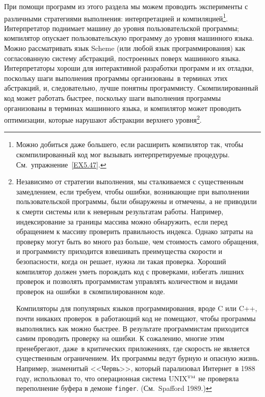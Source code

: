  
При помощи программ из этого раздела мы можем проводить
эксперименты с различными стратегиями выполнения: интерпретацией и
компиляцией\footnote{Можно добиться даже большего, если расширить
компилятор так, чтобы скомпилированный код мог вызывать
интерпретируемые процедуры.  См.~упражнение~\ref{EX5.47}.
}.
Интерпретатор поднимает машину до уровня пользовательской программы;
компилятор опускает пользовательскую программу до уровня машинного
языка.  Можно рассматривать язык Scheme (или любой язык
программирования) как согласованную систему абстракций, построенных
поверх машинного языка.  Интерпретаторы хороши для
интерактивной разработки программ и их отладки, поскольку шаги
выполнения программы организованы~в терминах этих абстракций, и,
следовательно, лучше понятны программисту.  Скомпилированный код может
работать быстрее, поскольку шаги выполнения программы организованы в
терминах машинного языка, и компилятор может проводить оптимизации,
которые нарушают абстракции верхнего уровня\footnote{Независимо от стратегии выполнения, мы
сталкиваемся с существенным замедлением, если требуем, чтобы ошибки,
возникающие при выполнении пользовательской программы, были  обнаружены
и отмечены, а не приводили к смерти системы или к неверным результатам
работы.  Например, индексирование за границы массива можно обнаружить, если
перед обращением к массиву проверить правильность индекса.  Однако
затраты на проверку могут быть во много раз больше, чем стоимость
самого обращения, и программисту приходится взвешивать преимущества
скорости и безопасности, когда он решает, нужна ли такая проверка.
Хороший компилятор должен уметь порождать код с проверками, избегать
лишних проверок и позволять программистам управлять количеством и
видами проверок на ошибки~в скомпилированном коде.

Компиляторы для популярных языков
программирования, вроде  C или C++, почти никаких 
проверок~в работающий 
код не помещают, чтобы программы выполнялись как можно быстрее.  В
результате программистам приходится самим проводить проверку на
ошибки.  К сожалению, многие этим пренебрегают, даже~в критических
приложениях, где скорость не является существенным ограничением.  Их
программы ведут бурную и опасную жизнь.  Например, знаменитый
<<Червь>>, который парализовал Интернет~в 1988 году, использовал то,
что операционная система  UNIX${}^{\mbox{\tiny TM}}$ не
проверяла переполнение буфера в демоне
{\tt finger}. (См.~Spafford 1989.)
}.

